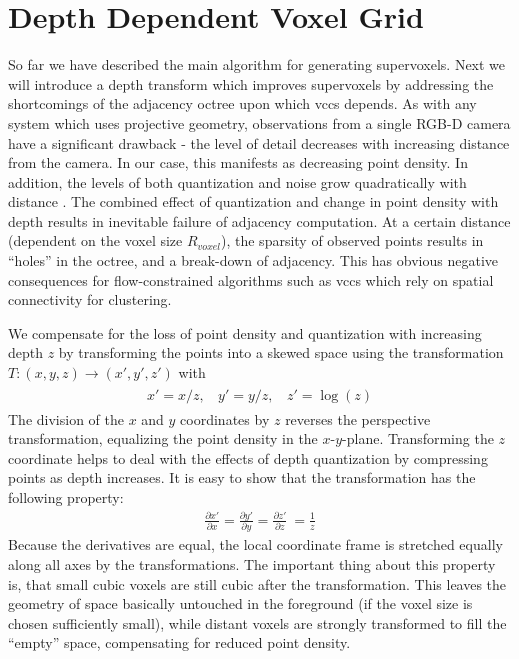 \section{Depth Dependent Voxel Grid}
So far we have described the main algorithm for generating supervoxels. Next we will introduce a depth transform which improves supervoxels by addressing the shortcomings of the adjacency octree upon which \gls{vccs} depends. As with any system which uses projective geometry, observations from a single RGB-D camera have a significant drawback - the level of detail decreases with increasing distance from the camera. In our case, this manifests as decreasing point density. In addition, the levels of both quantization and noise grow quadratically with distance \cite{ICCV11smisek, Khoshelham2012}. The combined effect of quantization and change in point density with depth results in inevitable failure of adjacency computation. At a certain distance (dependent on the voxel size $R_{voxel}$), the sparsity of observed points results in ``holes'' in the octree, and a break-down of adjacency. This has obvious negative consequences for flow-constrained algorithms such as \gls{vccs} which rely on spatial connectivity for clustering. 

We compensate for the loss of point density and quantization with increasing depth $z$ by transforming the points into a skewed space using the transformation $T:(x,y,z)\rightarrow(x',y',z')$ with
      \begin{align}
    \begin{aligned}
    x'= x/z,~~~~y'= y/z,~~~~z' = \log(z)
    \end{aligned}
      \end{align}
The division of the $x$ and $y$ coordinates by $z$ reverses the perspective transformation, equalizing the point density in the $x$-$y$-plane. Transforming the $z$ coordinate helps to deal with the effects of depth quantization by compressing points as depth increases. It is easy to show that the transformation has the following property:
\begin{align}
  \frac{\partial x'}{\partial x} = \frac{\partial y'}{\partial y} = \frac{\partial z'}{\partial z}~=\frac{1}{z}
\end{align}
Because the derivatives are equal, the local coordinate frame is stretched equally along all axes by the transformations. The important thing about this property is, that small cubic voxels are still cubic after the transformation. This leaves the geometry of space basically untouched in the foreground (if the voxel size is chosen sufficiently small), while distant voxels are strongly transformed to fill the ``empty'' space, compensating for reduced point density.

